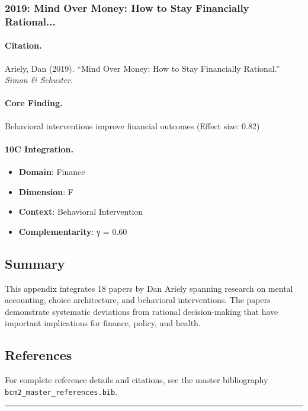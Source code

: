 \subsubsection{2019: Mind Over Money: How to Stay Financially Rational...}

\paragraph{Citation.}
Ariely, Dan (2019). ``Mind Over Money: How to Stay Financially Rational.''
\textit{Simon & Schuster}.

\paragraph{Core Finding.}
Behavioral interventions improve financial outcomes (Effect size: 0.82)

\paragraph{10C Integration.}
\begin{itemize}[nosep]
  \item \textbf{Domain}: Finance
  \item \textbf{Dimension}: F
  \item \textbf{Context}: Behavioral Intervention
  \item \textbf{Complementarity}: γ = 0.60
\end{itemize}

\subsection{Summary}

This appendix integrates 18 papers by Dan Ariely
spanning research on mental accounting, choice architecture, and behavioral
interventions. The papers demonstrate systematic deviations from rational
decision-making that have important implications for finance, policy, and health.

\subsection{References}

For complete reference details and citations, see the master bibliography
\texttt{bcm2\_master\_references.bib}.

\vspace{1em}
\hrule
\vspace{0.5em}

